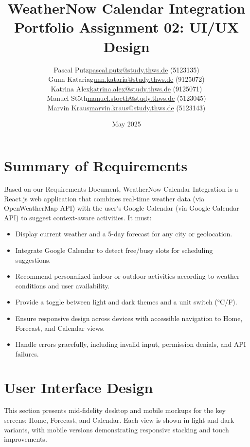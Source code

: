 \documentclass[fontsize=13pt,a4paper]{article}
\title{WeatherNow Calendar Integration\\\large Portfolio Assignment 02: UI/UX Design}
\author{
  \begin{tabular}{ll}
    Pascal Putz & \href{mailto:pascal.putz@study.thws.de}{pascal.putz@study.thws.de} (5123135)\\
    Gunn Kataria & \href{mailto:gunn.kataria@study.thws.de}{gunn.kataria@study.thws.de} (9125072)\\
    Katrina Alex & \href{mailto:katrina.alex@study.thws.de}{katrina.alex@study.thws.de} (9125071)\\
    Manuel Stöth & \href{mailto:manuel.stoeth@study.thws.de}{manuel.stoeth@study.thws.de} (5123045)\\
    Marvin Kraus & \href{mailto:marvin.kraus@study.thws.de}{marvin.kraus@study.thws.de} (5123143)
  \end{tabular}
}
\date{May 2025}
\begin{document}
\maketitle
\tableofcontents

\newpage

\section{Summary of Requirements}
Based on our Requirements Document, WeatherNow Calendar Integration is a React.js web application that combines real-time weather data (via OpenWeatherMap API) with the user’s Google Calendar (via Google Calendar API) to suggest context-aware activities. It must:

\begin{itemize}[noitemsep]
  \item Display current weather and a 5-day forecast for any city or geolocation.
  \item Integrate Google Calendar to detect free/busy slots for scheduling suggestions.
  \item Recommend personalized indoor or outdoor activities according to weather conditions and user availability.
  \item Provide a toggle between light and dark themes and a unit switch (°C/\textdegree F).
  \item Ensure responsive design across devices with accessible navigation to Home, Forecast, and Calendar views.
  \item Handle errors gracefully, including invalid input, permission denials, and API failures.
\end{itemize}

\section{User Interface Design}
This section presents mid-fidelity desktop and mobile mockups for the key screens: Home, Forecast, and Calendar. Each view is shown in light and dark variants, with mobile versions demonstrating responsive stacking and touch improvements.
\end{document}
